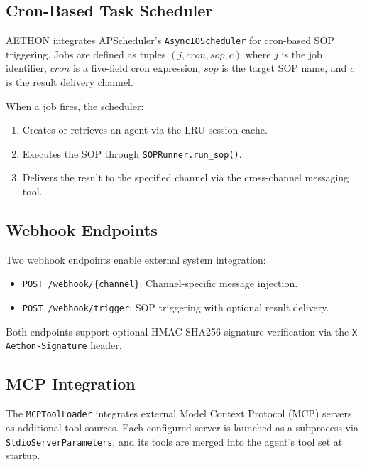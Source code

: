 \documentclass[9pt,twocolumn,letterpaper]{extarticle}
\begin{document}
\subsection{Cron-Based Task Scheduler}

AETHON integrates APScheduler's \texttt{AsyncIOScheduler} for cron-based SOP triggering.
Jobs are defined as tuples $(j, \textit{cron}, \textit{sop}, c)$ where $j$ is the job identifier, $\textit{cron}$ is a five-field cron expression, $\textit{sop}$ is the target SOP name, and $c$ is the result delivery channel.

When a job fires, the scheduler:
\begin{enumerate}[noitemsep,topsep=3pt]
  \item Creates or retrieves an agent via the LRU session cache.
  \item Executes the SOP through \texttt{SOPRunner.run\_sop()}.
  \item Delivers the result to the specified channel via the cross-channel messaging tool.
\end{enumerate}

\subsection{Webhook Endpoints}

Two webhook endpoints enable external system integration:

\begin{itemize}[noitemsep,topsep=3pt]
  \item \texttt{POST /webhook/\{channel\}}: Channel-specific message injection.
  \item \texttt{POST /webhook/trigger}: SOP triggering with optional result delivery.
\end{itemize}

Both endpoints support optional HMAC-SHA256 signature verification via the \texttt{X-Aethon-Signature} header.

\subsection{MCP Integration}

The \texttt{MCPToolLoader} integrates external Model Context Protocol (MCP) servers as additional tool sources.
Each configured server is launched as a subprocess via \texttt{StdioServerParameters}, and its tools are merged into the agent's tool set at startup.

\end{document}
